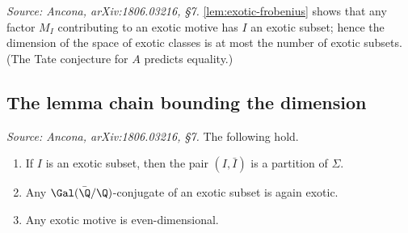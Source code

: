 \begin{remark}
  \label{rem:exotic-completare}
  \textit{Source: Ancona, arXiv:1806.03216, §7.}
  \cref{lem:exotic-frobenius} shows that any factor \(M_I\) contributing to an
  exotic motive has \(I\) an exotic subset; hence the dimension of the space of
  exotic classes is at most the number of exotic subsets. (The Tate conjecture
  for \(A\) predicts equality.)
\end{remark}

\subsection*{The lemma chain bounding the dimension}

\begin{lemma}
  \label{lem:exotic-partition}
  \textit{Source: Ancona, arXiv:1806.03216, §7.}
  The following hold.
  \begin{enumerate}
    \item If \(I\) is an exotic subset, then the pair \((I, \bar I)\) is a
      partition of \(\Sigma\).
    \item Any \(\Gal(\bar\Q/\Q)\)-conjugate of an exotic subset is again exotic.
    \item Any exotic motive is even-dimensional.
  \end{enumerate}
\end{lemma}

